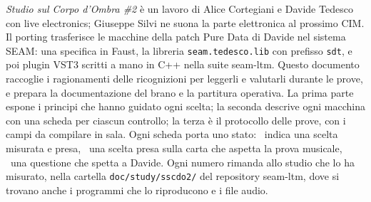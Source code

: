 \emph{Studio sul Corpo d'Ombra \#2} è un lavoro di Alice Cortegiani e Davide Tedesco con live electronics; Giuseppe Silvi ne suona la parte elettronica al prossimo CIM.
Il porting trasferisce le macchine della patch Pure Data di Davide nel sistema SEAM: una specifica in Faust, la libreria \texttt{seam.tedesco.lib} con prefisso \texttt{sdt}, e poi plugin VST3 scritti a mano in C++ nella suite seam-ltm.
Questo documento raccoglie i ragionamenti delle ricognizioni per leggerli e valutarli durante le prove, e prepara la documentazione del brano e la partitura operativa.
La prima parte espone i principi che hanno guidato ogni scelta; la seconda descrive ogni macchina con una scheda per ciascun controllo; la terza è il protocollo delle prove, con i campi da compilare in sala.
Ogni scheda porta uno stato: \deciso\ indica una scelta misurata e presa, \daprovare\ una scelta presa sulla carta che aspetta la prova musicale, \domanda\ una questione che spetta a Davide.
Ogni numero rimanda allo studio che lo ha misurato, nella cartella \texttt{doc/study/sscdo2/} del repository seam-ltm, dove si trovano anche i programmi che lo riproducono e i file audio.
